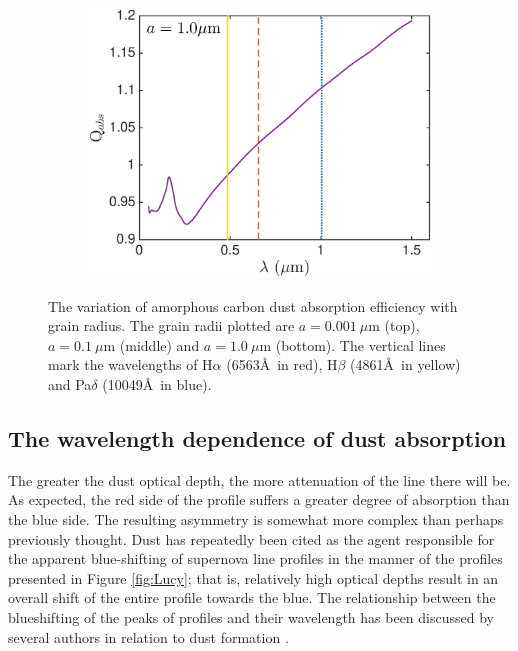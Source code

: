 \begin{figure}
\begin{subfigure}{\textwidth}
\centering
\includegraphics[trim =0 0 45 15,clip=true,scale=0.5]{chapters/chapter4/images/Qabs_a1_0}
\end{subfigure}
\caption{The variation of amorphous carbon dust absorption efficiency with grain radius. The grain radii plotted are $a=0.001~\mu$m (top), $a=0.1~\mu$m (middle) and $a=1.0~\mu$m (bottom).  The vertical lines mark the wavelengths of H$\alpha$ (6563\AA\ in red), H$\beta$ (4861\AA\ in yellow) and Pa$\delta$ (10049\AA\ in blue).}
\label{wav_dep2}
\end{figure}






\subsection{The wavelength dependence of dust absorption}
\label{asym}
The greater the dust optical depth, the more attenuation of the line 
there will be.  As expected, the red side of the profile suffers a greater 
degree of absorption than the blue side.  The resulting asymmetry is 
somewhat more complex than perhaps previously thought.  Dust has 
repeatedly been cited as the agent responsible for the apparent 
blue-shifting of supernova line profiles in the manner of the profiles 
presented in Figure \ref{fig:Lucy}; that is, relatively high optical 
depths result in an overall shift of the entire profile towards the blue.
 The relationship between the blueshifting of the peaks 
of profiles and their wavelength has been discussed by several authors in 
relation to dust formation \citep{Smith2012, Fransson2014, Gall2014}.  
  
